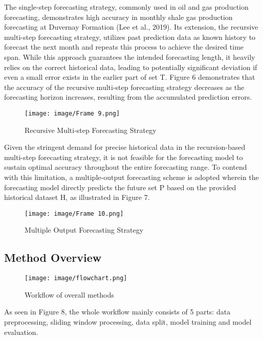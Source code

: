 \documentclass[sn-mathphys,Numbered]{sn-jnl}%
\theoremstyle{thmstyleone}%
\theoremstyle{thmstyletwo}%
\theoremstyle{thmstylethree}%
\begin{document}
The single-step forecasting strategy, commonly used in oil and gas production forecasting, demonstrates high accuracy in monthly shale gas production forecasting at Duvernay Formation (Lee et al., 2019). Its extension, the recursive multi-step forecasting strategy, utilizes past prediction data as known history to forecast the next month and repeats this process to achieve the desired time span. While this approach guarantees the intended forecasting length, it heavily relies on the correct historical data, leading to potentially significant deviation if even a small error exists in the earlier part of set T. Figure 6 demonstrates that the accuracy of the recursive multi-step forecasting strategy decreases as the forecasting horizon increases, resulting from the accumulated prediction errors.

\begin{figure}[htp]
    \centering
    \texttt{[image: image/Frame 9.png]}
    \caption{\centering  Recursive Multi-step Forecasting Strategy}
    \label{fig:recursive}
\end{figure}

Given the stringent demand for precise historical data in the recursion-based multi-step forecasting strategy, it is not feasible for the forecasting model to sustain optimal accuracy throughout the entire forecasting range. To contend with this limitation, a multiple-output forecasting scheme is adopted wherein the forecasting model directly predicts the future set P based on the provided historical dataset H, as illustrated in Figure 7.

\begin{figure}[htp]
    \centering
    \texttt{[image: image/Frame 10.png]}
    \caption{\centering  Multiple Output Forecasting Strategy}
    \label{fig:multiple output}
\end{figure}

\subsection{Method Overview}\label{subsec7}

\begin{figure}[htp]
    \centering
    \texttt{[image: image/flowchart.png]}
    \caption{\centering  Workflow of overall methods}
    \label{fig:workflow}
\end{figure}

As seen in Figure 8, the whole workflow mainly consists of 5 parts: data preprocessing, sliding window processing, data split, model training and model evaluation.
\end{document}
